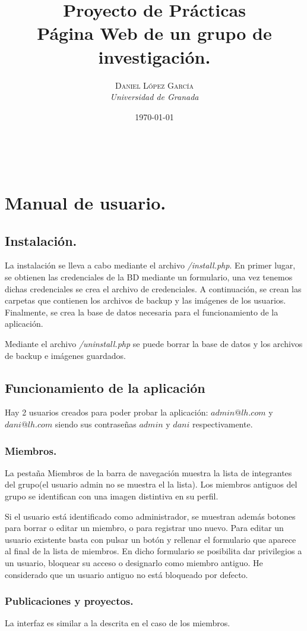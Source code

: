 \documentclass[a4paper, 11pt]{article} %
\title{\textbf{Proyecto de Prácticas}\\ %
\vspace{20 pt}Página Web de un grupo de investigación.
} %
\author{\textsc{Daniel López García} %
\\{\textit{Universidad de Granada}}} %
\date{\today} %
\makeatletter
\renewcommand{\maketitle}{ %
	\begin{center} %
		{\Huge\@title} %
	\end{center}
	
	\vspace{20pt} %
	
	\begin{flushright} %
		{\large\@author} %
		\\\@date %
		
		\vspace{40pt} %
	\end{flushright}
	\renewcommand{\baselinestretch}{0.5}
	
}
\makeatother
\begin{document}
	\maketitle
\section{Manual de usuario.}
\subsection{Instalación.}
La instalación se lleva a cabo mediante el archivo \emph{/install.php}. En primer lugar, se obtienen las credenciales de la BD mediante un formulario, una vez tenemos dichas credenciales se crea el archivo de credenciales. A continuación, se crean las carpetas que contienen los archivos de backup y las imágenes de los usuarios. Finalmente, se crea la base de datos necesaria para el funcionamiento de la aplicación.

Mediante el archivo \emph{/uninstall.php} se puede borrar la base de datos y los archivos de backup e imágenes guardados.
\subsection{Funcionamiento de la aplicación}Hay 2 usuarios creados para poder probar la aplicación: $admin@lh.com$ y $dani@lh.com$ siendo sus contraseñas $admin$ y $dani$ respectivamente. 
\subsubsection{Miembros.} La pestaña Miembros de la barra de navegación muestra la lista de integrantes del grupo(el usuario admin no se muestra el la lista). Los miembros antiguos del grupo se identifican con una imagen distintiva en su perfil. 

\medskip

Si el usuario está identificado como administrador, se muestran además botones para borrar o editar un miembro, o para registrar uno nuevo. Para editar un usuario existente basta con pulsar un botón y rellenar el formulario que aparece al final de la lista de miembros. En dicho formulario se posibilita dar privilegios a un usuario, bloquear su acceso o designarlo como miembro antiguo. He considerado que un usuario antiguo no está bloqueado por defecto.

\subsubsection{Publicaciones y proyectos.} La interfaz es similar a la descrita en el caso de los miembros.
\end{document}
